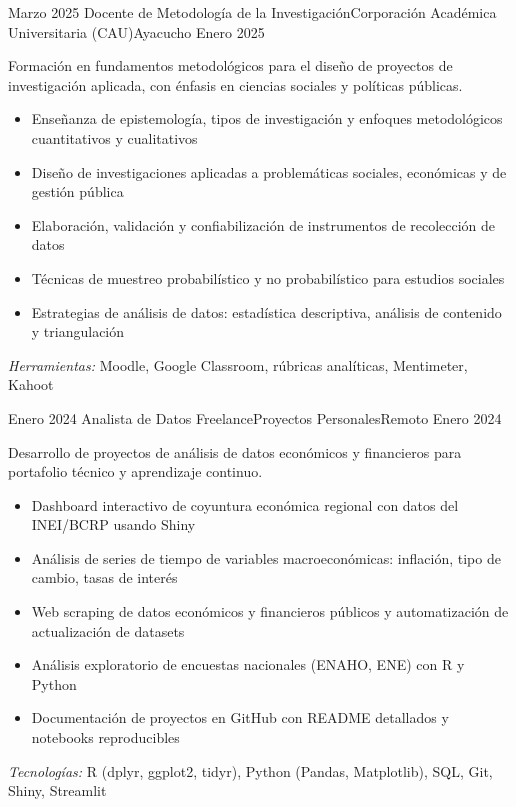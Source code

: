 \begin{experiences}
\experience
{Marzo 2025} {Docente de Metodología de la Investigación}{Corporación Académica Universitaria (CAU)}{Ayacucho}
{Enero 2025} {
	Formación en fundamentos metodológicos para el diseño de proyectos de investigación aplicada, con énfasis en ciencias sociales y políticas públicas.
	\begin{itemize}
		\item Enseñanza de epistemología, tipos de investigación y enfoques metodológicos cuantitativos y cualitativos
		\item Diseño de investigaciones aplicadas a problemáticas sociales, económicas y de gestión pública
		\item Elaboración, validación y confiabilización de instrumentos de recolección de datos
		\item Técnicas de muestreo probabilístico y no probabilístico para estudios sociales
		\item Estrategias de análisis de datos: estadística descriptiva, análisis de contenido y triangulación
	\end{itemize}
}
{\footnotesize{\emph{Herramientas:} Moodle, Google Classroom, rúbricas analíticas, Mentimeter, Kahoot}}
\emptySeparator

\experience
{Enero 2024} {Analista de Datos Freelance}{Proyectos Personales}{Remoto}
{Enero 2024} {
	Desarrollo de proyectos de análisis de datos económicos y financieros para portafolio técnico y aprendizaje continuo.
	\begin{itemize}
		\item Dashboard interactivo de coyuntura económica regional con datos del INEI/BCRP usando Shiny
		\item Análisis de series de tiempo de variables macroeconómicas: inflación, tipo de cambio, tasas de interés
		\item Web scraping de datos económicos y financieros públicos y automatización de actualización de datasets
		\item Análisis exploratorio de encuestas nacionales (ENAHO, ENE) con R y Python
		\item Documentación de proyectos en GitHub con README detallados y notebooks reproducibles
	\end{itemize}
}
{\footnotesize{\emph{Tecnologías:} R (dplyr, ggplot2, tidyr), Python (Pandas, Matplotlib), SQL, Git, Shiny, Streamlit}}
\emptySeparator


\end{experiences}
